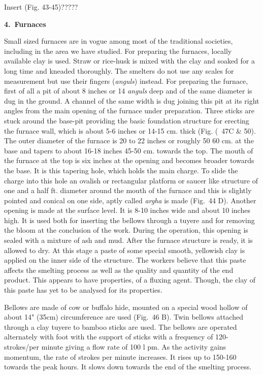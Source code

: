 Insert (Fig. 43-45)?????


\noindent \textbf{\large 4.~Furnaces}

Small sized furnaces are in vogue among most of the traditional societies, including in the area we have studied. For preparing the furnaces, locally available clay is used. Straw or rice-husk is mixed with the clay and soaked for a long time and kneaded thoroughly. The smelters do not use any scales for measurement but use their fingers ({\it anguls}) instead. For preparing the furnace, first of all a pit of about 8 inches or 14 {\it anguls} deep and of the same diameter is dug in the ground. A channel of the same width is dug joining this pit at its right angles from the main opening of the furnace under preparation. Three sticks are stuck around the base-pit providing the basic foundation structure for erecting the furnace wall, which is about 5-6 inches or 14-15 cm. thick (Fig. (~47C \& 50). The outer diameter of the furnace is 20 to 22 inches or roughly 50 60 cm. at the base and tapers to about 16-18 inches 45-50 cm. towards the top. The mouth of the furnace at the top is six inches at the opening and becomes broader towards the base. It is this tapering hole, which holds the main charge. To slide the charge into this hole an ovalish or rectangular platform or saucer like structure of one and a half ft. diameter around the mouth of the furnace and this is slightly pointed and conical on one side, aptly called {\it argha} is made (Fig.~44 D). Another opening is made at the surface level. It is 8-10 inches wide and about 10 inches high. It is used both for inserting the bellows through a tuyere and for removing the bloom at the conclusion of the work. During the operation, this opening is sealed with a mixture of ash and mud. After the furnace structure is ready, it is allowed to dry. At this stage a paste of some special smooth, yellowish clay is applied on the inner side of the structure. The workers believe that this paste affects the smelting process as well as the quality and quantity of the end product. This appears to have properties, of a fluxing agent. Though, the clay of this paste has yet to be analysed for its properties.

Bellows are made of cow or buffalo hide, mounted on a special wood hollow of about 14" (35cm) circumference are used (Fig.~46 B). Twin bellows attached through a clay tuyere to bamboo sticks are used. The bellows are operated alternately with foot with the support of sticks with a frequency of 120-strokes/per minute giving a flow rate of 100 l pm. As the activity gains momentum, the rate of strokes per minute increases. It rises up to 150-160 towards the peak hours. It slows down towards the end of the smelting process.

